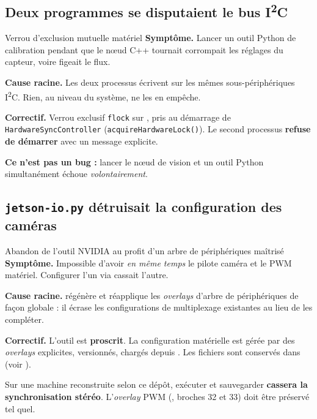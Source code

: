 \documentclass[11pt,a4paper]{article}
\begin{document}
\subsection{Deux programmes se disputaient le bus I\textsuperscript{2}C}

\begin{verroulevé}{Verrou d'exclusion mutuelle matériel}
\textbf{Symptôme.} Lancer un outil Python de calibration pendant que le n\oe ud C++ tournait
corrompait les réglages du capteur, voire figeait le flux.

\textbf{Cause racine.} Les deux processus écrivent sur les mêmes sous-périphériques
I\textsuperscript{2}C. Rien, au niveau du système, ne les en empêche.

\textbf{Correctif.} Verrou exclusif \texttt{flock} sur ,
pris au démarrage de \texttt{HardwareSyncController} (\texttt{acquireHardwareLock()}).
Le second processus \textbf{refuse de démarrer} avec un message explicite.

\textbf{Ce n'est pas un bug :} lancer le n\oe ud de vision et un outil Python simultanément
échoue \emph{volontairement}.
\end{verroulevé}

\subsection{\texttt{jetson-io.py} détruisait la configuration des caméras}

\begin{verroulevé}{Abandon de l'outil NVIDIA au profit d'un arbre de périphériques maîtrisé}
\textbf{Symptôme.} Impossible d'avoir \emph{en même temps} le pilote caméra et le PWM
matériel. Configurer l'un via  cassait l'autre.

\textbf{Cause racine.}  régénère et réapplique les \emph{overlays}
d'arbre de périphériques de façon globale : il écrase les configurations de multiplexage
existantes au lieu de les compléter.

\textbf{Correctif.} L'outil est \textbf{proscrit}. La configuration matérielle est gérée
par des \emph{overlays} explicites, versionnés, chargés depuis
. Les fichiers sont conservés dans
 (voir ).

\begin{avertissement}
Sur une machine reconstruite selon ce dépôt, exécuter  et sauvegarder
\textbf{cassera la synchronisation stéréo}. L'\emph{overlay} PWM
(, broches 32 et 33) doit être préservé tel quel.
\end{avertissement}
\end{verroulevé}
\end{document}
